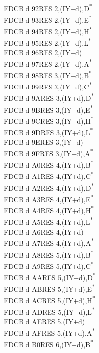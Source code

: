 \documentclass[twoside,openright,a4paper]{book}
\begin{document}
\begin{multicols}{3}
{\begin{tabbing}
	FDCB d 92\>RES 2,(IY+d),D\textsuperscript{*}\\
	FDCB d 93\>RES 2,(IY+d),E\textsuperscript{*}\\
	FDCB d 94\>RES 2,(IY+d),H\textsuperscript{*}\\
	FDCB d 95\>RES 2,(IY+d),L\textsuperscript{*}\\
	FDCB d 96\>RES 2,(IY+d)\\
	FDCB d 97\>RES 2,(IY+d),A\textsuperscript{*}\\
	FDCB d 98\>RES 3,(IY+d),B\textsuperscript{*}\\
	FDCB d 99\>RES 3,(IY+d),C\textsuperscript{*}\\
	FDCB d 9A\>RES 3,(IY+d),D\textsuperscript{*}\\
	FDCB d 9B\>RES 3,(IY+d),E\textsuperscript{*}\\
	FDCB d 9C\>RES 3,(IY+d),H\textsuperscript{*}\\
	FDCB d 9D\>RES 3,(IY+d),L\textsuperscript{*}\\
	FDCB d 9E\>RES 3,(IY+d)\\
	FDCB d 9F\>RES 3,(IY+d),A\textsuperscript{*}\\
	FDCB d A0\>RES 4,(IY+d),B\textsuperscript{*}\\
	FDCB d A1\>RES 4,(IY+d),C\textsuperscript{*}\\
	FDCB d A2\>RES 4,(IY+d),D\textsuperscript{*}\\
	FDCB d A3\>RES 4,(IY+d),E\textsuperscript{*}\\
	FDCB d A4\>RES 4,(IY+d),H\textsuperscript{*}\\
	FDCB d A5\>RES 4,(IY+d),L\textsuperscript{*}\\
	FDCB d A6\>RES 4,(IY+d)\\
	FDCB d A7\>RES 4,(IY+d),A\textsuperscript{*}\\
	FDCB d A8\>RES 5,(IY+d),B\textsuperscript{*}\\
	FDCB d A9\>RES 5,(IY+d),C\textsuperscript{*}\\
	FDCB d AA\>RES 5,(IY+d),D\textsuperscript{*}\\
	FDCB d AB\>RES 5,(IY+d),E\textsuperscript{*}\\
	FDCB d AC\>RES 5,(IY+d),H\textsuperscript{*}\\
	FDCB d AD\>RES 5,(IY+d),L\textsuperscript{*}\\
	FDCB d AE\>RES 5,(IY+d)\\
	FDCB d AF\>RES 5,(IY+d),A\textsuperscript{*}\\
	FDCB d B0\>RES 6,(IY+d),B\textsuperscript{*}\\

\end{tabbing}}
\end{multicols}
\end{document}
